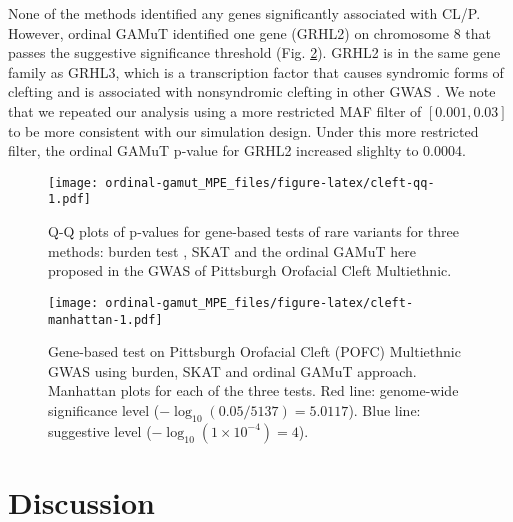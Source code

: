 \documentclass[]{article}
\begin{document}
None of the methods identified any genes significantly associated with CL/P. However, ordinal GAMuT
identified one gene (GRHL2) on chromosome 8 that passes the suggestive significance threshold (Fig. \ref{fig:cleft-manhattan}). GRHL2 is in the same gene family as GRHL3, which is a transcription factor that causes syndromic forms of clefting and is associated with nonsyndromic clefting in other GWAS \citep{Leslie2016, Leslie2016b, Carpinelli2017, PeyrardJanvid2014}. We note that we repeated our analysis using a more restricted MAF filter of \([0.001,0.03]\) to be more consistent with our simulation design. Under this more restricted filter, the ordinal GAMuT p-value for GRHL2 increased slighlty to 0.0004.

\begin{figure}
\centering
\texttt{[image: ordinal-gamut\_MPE\_files/figure-latex/cleft-qq-1.pdf]}
\caption{\label{fig:cleft-qq}Q-Q plots of p-values for gene-based tests of rare variants for three methods: burden test \citep{Li2008, Madsen2009}, SKAT \citep{Wu2011} and the ordinal GAMuT here proposed in the GWAS of Pittsburgh Orofacial Cleft Multiethnic.}
\end{figure}

\begin{figure}
\centering
\texttt{[image: ordinal-gamut\_MPE\_files/figure-latex/cleft-manhattan-1.pdf]}
\caption{\label{fig:cleft-manhattan}Gene-based test on Pittsburgh Orofacial Cleft (POFC) Multiethnic GWAS using burden, SKAT and ordinal GAMuT approach. Manhattan plots for each of the three tests. Red line: genome-wide significance level (\(-\log_{10}(0.05/5137) = 5.0117\)). Blue line: suggestive level (\(-\log_{10}(1 \times 10 ^{-4}) = 4\)).}
\end{figure}

\hypertarget{discussion}{%
\section{Discussion}\label{discussion}}
\end{document}
